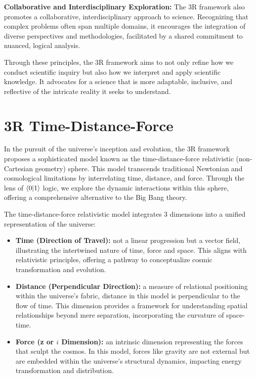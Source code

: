 \documentclass[12pt]{article}
\begin{document}
\textbf{Collaborative and Interdisciplinary Exploration:} The 3R framework also promotes a collaborative, interdisciplinary approach to science. Recognizing that complex problems often span multiple domains, it encourages the integration of diverse perspectives and methodologies, facilitated by a shared commitment to nuanced, logical analysis.

Through these principles, the 3R framework aims to not only refine how we conduct scientific inquiry but also how we interpret and apply scientific knowledge. It advocates for a science that is more adaptable, inclusive, and reflective of the intricate reality it seeks to understand.

\section*{3R Time-Distance-Force}

In the pursuit of the universe's inception and evolution, the 3R framework proposes a sophisticated model known as the time-distance-force relativistic (non-Cartesian geometry) sphere. This model transcends traditional Newtonian and cosmological limitations by interrelating time, distance, and force. Through the lens of \(\langle 0 | 1 \rangle\) logic, we explore the dynamic interactions within this sphere, offering a comprehensive alternative to the Big Bang theory.

The time-distance-force relativistic model integrates 3 dimensions into a unified representation of the universe:

\begin{itemize}
    \item \textbf{Time (Direction of Travel):} not a linear progression but a vector field, illustrating the intertwined nature of time, force and space. This aligns with relativistic principles, offering a pathway to conceptualize cosmic transformation and evolution.
    \item \textbf{Distance (Perpendicular Direction):} a measure of relational positioning within the universe's fabric, distance in this model is perpendicular to the flow of time. This dimension provides a framework for understanding spatial relationships beyond mere separation, incorporating the curvature of space-time.
    \item \textbf{Force (z or \(i\) Dimension):} an intrinsic dimension representing the forces that sculpt the cosmos. In this model, forces like gravity are not external but are embedded within the universe's structural dynamics, impacting energy transformation and distribution.
\end{itemize}
\end{document}
